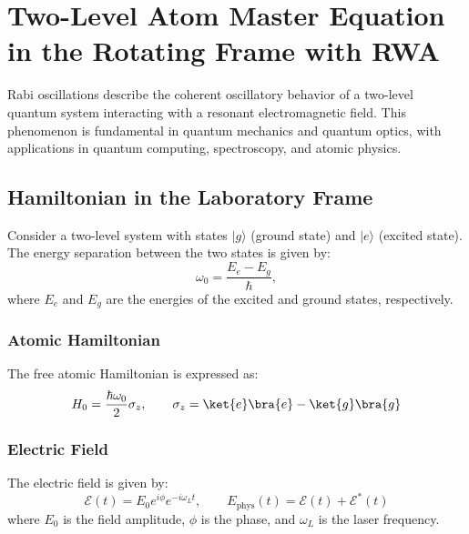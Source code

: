 
\section{Two-Level Atom Master Equation in the Rotating Frame with RWA}

Rabi oscillations describe the coherent oscillatory behavior of a two-level quantum system interacting with a resonant electromagnetic field.
This phenomenon is fundamental in quantum mechanics and quantum optics, with applications in quantum computing, spectroscopy, and atomic physics.

\subsection{Hamiltonian in the Laboratory Frame}

Consider a two-level system with states \(|g\rangle\) (ground state) and \(|e\rangle\) (excited state).
The energy separation between the two states is given by:
\begin{equation}
	\omega_0 = \frac{E_e - E_g}{\hbar},
	\label{eq:EnergySeparation}
\end{equation}
where \(E_e\) and \(E_g\) are the energies of the excited and ground states, respectively.

\subsubsection{Atomic Hamiltonian}
The free atomic Hamiltonian is expressed as:
\begin{equation}
	H_0 = \frac{\hbar\omega_0}{2} \sigma_z, \qquad \sigma_z = \ket{e}\bra{e} - \ket{g}\bra{g}
	\label{eq:AtomicHamiltonian}
\end{equation}

\subsubsection{Electric Field}
The electric field is given by:
\begin{equation}
	\mathcal{E}(t) = E_0 e^{i\phi} e^{-i\omega_L t}, \qquad
	E_{\text{phys}}(t) = \mathcal{E}(t) + \mathcal{E}^*(t)
	\label{eq:ElectricFieldComplex}
\end{equation}
where \(E_0\) is the field amplitude, \(\phi\) is the phase, and \(\omega_L\) is the laser frequency.

